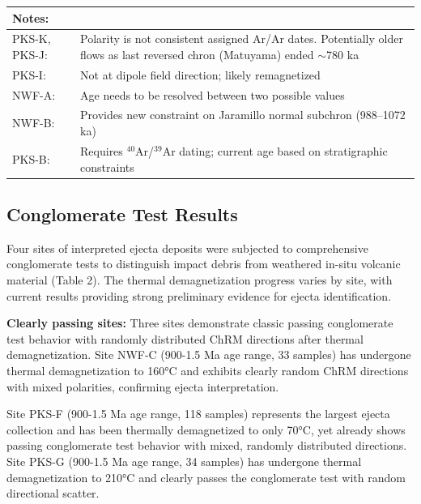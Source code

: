 \documentclass[twocolumn,11pt]{article}
\begin{document}
\begin{table}[htbp]
    \footnotesize
    \begin{tabular}{|p{}|p{}|}
        \hline
        \textbf{Notes:} & \\
        \hline
        PKS-K, PKS-J: & Polarity is not consistent assigned Ar/Ar dates. Potentially older flows as last reversed chron (Matuyama) ended $\sim$780 ka \\
        \hline
        PKS-I: & Not at dipole field direction; likely remagnetized \\
        \hline
        NWF-A: & Age needs to be resolved between two possible values \\
        \hline
        NWF-B: & Provides new constraint on Jaramillo normal subchron (988--1072 ka) \\
        \hline
        PKS-B: & Requires $^{40}$Ar/$^{39}$Ar dating; current age based on stratigraphic constraints \\
        \hline
    \end{tabular}
\end{table}

\subsection{Conglomerate Test Results}

Four sites of interpreted ejecta deposits were subjected to comprehensive conglomerate tests to distinguish impact debris from weathered in-situ volcanic material (Table 2). The thermal demagnetization progress varies by site, with current results providing strong preliminary evidence for ejecta identification.

\textbf{Clearly passing sites:} Three sites demonstrate classic passing conglomerate test behavior with randomly distributed ChRM directions after thermal demagnetization. Site NWF-C (900-1.5 Ma age range, 33 samples) has undergone thermal demagnetization to 160°C and exhibits clearly random ChRM directions with mixed polarities, confirming ejecta interpretation.

Site PKS-F (900-1.5 Ma age range, 118 samples) represents the largest ejecta collection and has been thermally demagnetized to only 70°C, yet already shows passing conglomerate test behavior with mixed, randomly distributed directions. Site PKS-G (900-1.5 Ma age range, 34 samples) has undergone thermal demagnetization to 210°C and clearly passes the conglomerate test with random directional scatter.
\end{document}
